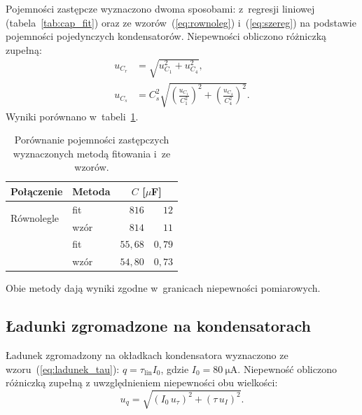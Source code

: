 \documentclass[12pt, a4paper]{article}
\begin{document}
Pojemności zastępcze wyznaczono dwoma sposobami: z~regresji liniowej (tabela~\ref{tab:cap_fit})
oraz ze wzorów~(\ref{eq:rownoleg}) i~(\ref{eq:szereg}) na podstawie pojemności
pojedynczych kondensatorów. Niepewności obliczono różniczką zupełną:
\begin{align}
    u_{C_r} &= \sqrt{u_{C_1}^2 + u_{C_4}^2}, \label{eq:uCr}\\
    u_{C_s} &= C_s^2\sqrt{{\left(\frac{u_{C_1}}{C_1^2}\right)}^{\!2}
                          + {\left(\frac{u_{C_4}}{C_4^2}\right)}^{\!2}}. \label{eq:uCs}
\end{align}
Wyniki porównano w~tabeli~\ref{tab:cap_compare}.

\begin{table}[H]
\centering
\caption{Porównanie pojemności zastępczych wyznaczonych metodą fitowania
         i~ze wzorów.}\label{tab:cap_compare}
\begin{tabular}{l l r @{\;$\pm$\;} r}
\toprule
Połączenie & Metoda & \multicolumn{2}{c}{$C$ [$\mu$F]} \\
\midrule
\multirow{2}{*}{Równolegle}
  & fit           & $816$     & $12$     \\
  & wzór          & $814$     & $11$     \\
\addlinespace
\multirow{2}{*}{Szeregowo}
  & fit           & $55{,}68$ & $0{,}79$ \\
  & wzór          & $54{,}80$ & $0{,}73$ \\
\bottomrule
\end{tabular}
\end{table}

Obie metody dają wyniki zgodne w~granicach niepewności pomiarowych.

\subsection{Ładunki zgromadzone na kondensatorach}

Ładunek zgromadzony na okładkach kondensatora wyznaczono ze wzoru~(\ref{eq:ladunek_tau}):
$q = \tau_\text{lin} I_0$, gdzie $I_0 = \SI{80}{\micro\ampere}$.
Niepewność obliczono różniczką zupełną z uwzględnieniem niepewności obu wielkości:
\begin{equation}
    u_q = \sqrt{{\left(I_0\, u_{\tau}\right)}^{\!2}
               + {\left(\tau\, u_I\right)}^{\!2}}.
    \label{eq:uq}
\end{equation}
\end{document}
